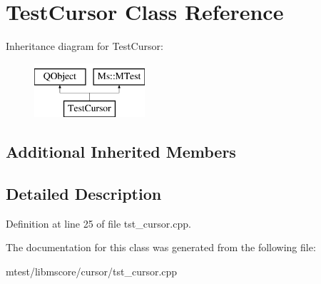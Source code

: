 \hypertarget{class_test_cursor}{}\section{Test\+Cursor Class Reference}
\label{class_test_cursor}
Inheritance diagram for Test\+Cursor\+:\begin{figure}[H]
\begin{center}
\leavevmode
\includegraphics[height=2.000000cm]{class_test_cursor}
\end{center}
\end{figure}
\subsection*{Additional Inherited Members}


\subsection{Detailed Description}


Definition at line 25 of file tst\+\_\+cursor.\+cpp.



The documentation for this class was generated from the following file\+:\begin{DoxyCompactItemize}
\item 
mtest/libmscore/cursor/tst\+\_\+cursor.\+cpp\end{DoxyCompactItemize}
